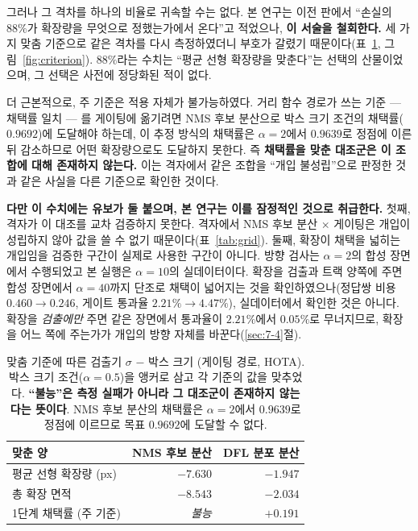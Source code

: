 \documentclass[12pt,a4paper,oneside]{report}
\begin{document}
그러나 그 격차를 하나의 비율로 귀속할 수는 없다. 본 연구는 이전 판에서 ``손실의 $88\%$가 확장량을 무엇으로 정했는가에서 온다''고 적었으나, \textbf{이 서술을 철회한다.} 세 가지 맞춤 기준으로 같은 격차를 다시 측정하였더니 부호가 갈렸기 때문이다(표~\ref{tab:criterion}, 그림~\ref{fig:criterion}). $88\%$라는 수치는 ``평균 선형 확장량을 맞춘다''는 선택의 산물이었으며, 그 선택은 사전에 정당화된 적이 없다.

더 근본적으로, 주 기준은 적용 자체가 불가능하였다. 거리 함수 경로가 쓰는 기준 --- 채택률 일치 --- 를 게이팅에 옮기려면 NMS 후보 분산으로 박스 크기 조건의 채택률($0.9692$)에 도달해야 하는데, 이 추정 방식의 채택률은 $\alpha = 2$에서 $0.9639$로 정점에 이른 뒤 감소하므로 어떤 확장량으로도 도달하지 못한다. 즉 \textbf{채택률을 맞춘 대조군은 이 조합에 대해 존재하지 않는다.} 이는 격자에서 같은 조합을 ``개입 불성립''으로 판정한 것과 같은 사실을 다른 기준으로 확인한 것이다.

\textbf{다만 이 수치에는 유보가 둘 붙으며, 본 연구는 이를 잠정적인 것으로 취급한다.} 첫째, 격자가 이 대조를 교차 검증하지 못한다. 격자에서 NMS 후보 분산 $\times$ 게이팅은 개입이 성립하지 않아 값을 쓸 수 없기 때문이다(표~\ref{tab:grid}). 둘째, 확장이 채택을 넓히는 개입임을 검증한 구간이 실제로 사용한 구간이 아니다. 방향 검사는 $\alpha = 2$의 합성 장면에서 수행되었고 본 실행은 $\alpha = 10$의 실데이터이다. 확장을 검출과 트랙 양쪽에 주면 합성 장면에서 $\alpha = 40$까지 단조로 채택이 넓어지는 것을 확인하였으나(정답쌍 비용 $0.460 \to 0.246$, 게이트 통과율 $2.21\% \to 4.47\%$), 실데이터에서 확인한 것은 아니다. 확장을 \textit{검출에만} 주면 같은 장면에서 통과율이 $2.21\%$에서 $0.05\%$로 무너지므로, 확장을 어느 쪽에 주는가가 개입의 방향 자체를 바꾼다(\ref{sec:7-4}절).

\begin{table}[htbp]
\centering
\small
\caption{맞춤 기준에 따른 검출기 $\sigma$ $-$ 박스 크기 (게이팅 경로, HOTA). 박스 크기 조건($\alpha = 0.5$)을 앵커로 삼고 각 기준의 값을 맞추었다. \textbf{``불능''은 측정 실패가 아니라 그 대조군이 존재하지 않는다는 뜻이다}. NMS 후보 분산의 채택률은 $\alpha = 2$에서 $0.9639$로 정점에 이르므로 목표 $0.9692$에 도달할 수 없다.}
\label{tab:criterion}
\begin{tabular}{lrr}
\toprule
맞춘 양 & NMS 후보 분산 & DFL 분포 분산 \\
\midrule
평균 선형 확장량 (px) & $-7.630$ & $-1.947$ \\
총 확장 면적 & $-8.543$ & $-2.034$ \\
1단계 채택률 (주 기준) & \textit{불능} & $\mathbf{+0.191}$ \\
\bottomrule
\end{tabular}
\end{table}
\end{document}

